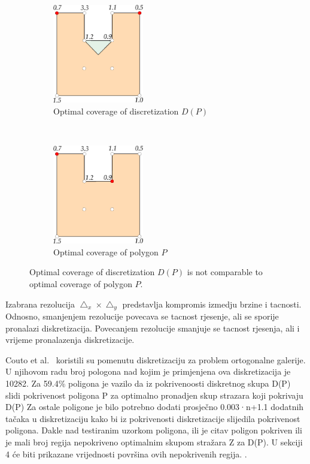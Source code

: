 \documentclass[runningheads,a4paper]{elsarticle}
\begin{document}
	\begin{figure}[t!]
    	\centering
    	\begin{subfigure}[t]{0.49\textwidth}
        	\centering
        	\includegraphics[height=1.7in]{slika1a.eps}
        	\caption{Optimal coverage of discretization $D(P)$}
    	\end{subfigure}%
    	~ 
    	\begin{subfigure}[t]{0.49\textwidth}
        	\centering
        	\includegraphics[height=1.7in]{slika1b.eps}
        	\caption{Optimal coverage of polygon $P$}
    	\end{subfigure}
    	\caption{Optimal coverage of discretization $D(P)$ is not comparable to optimal coverage of polygon $P$.}
	\end{figure}
	
	Izabrana rezolucija $\bigtriangleup_{x}\times\bigtriangleup_{y}$ predstavlja kompromis izmedju brzine i tacnosti. Odnosno, smanjenjem rezolucije povecava se tacnost rjesenje, ali se sporije pronalazi diskretizacija. Povecanjem rezolucije smanjuje se tacnost rjesenja, ali i vrijeme pronalazenja diskretizacije.
	
	Couto et al.~\cite{couto2007exact} koristili su pomenutu diskretizaciju za problem ortogonalne galerije. U njihovom radu broj pologona nad kojim je primjenjena ova diskretizacija je 10282. Za 59.4\% poligona je vazilo da iz pokrivenoosti diskretnog skupa D(P) slidi pokrivenost poligona P za optimalno pronadjen skup strazara koji pokrivaju D(P) Za ostale poligone je bilo potrebno dodati prosječno 0.003·n+1.1 dodatnih tačaka u diskretizaciju kako bi iz pokrivenosti diskretizacije slijedila pokrivenost poligona. Dakle nad testiranim uzorkom poligona, ili je citav poligon pokriven ili je mali broj regija nepokriveno optimalnim skupom stražara Z za D(P). U sekciji 4 će biti prikazane vrijednosti površina ovih nepokrivenih regija.    . 
	
\end{document}
